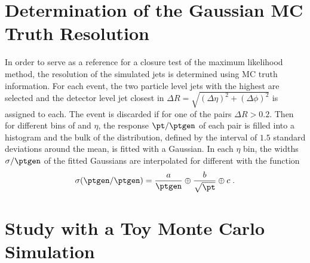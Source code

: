 \appendix


\section{Determination of the Gaussian MC Truth Resolution}\label{sec:ResFit:App:MCTruth}

In order to serve as a reference for a closure test of the maximum
likelihood method, the resolution of the simulated jets is
determined using MC truth information.
For each event, the two particle level jets with the highest \ptgen
are selected and the detector level jet closest in
\mbox{$\Delta R = \sqrt{(\Delta\eta)^{2} + (\Delta\phi)^{2}}$} is assigned to each.
The event is discarded if for one of the pairs $\Delta R > 0.2$.
Then for different bins of \ptgen and $\eta$, the response $\pt/\ptgen$ of each pair is filled into a
histogram and the bulk of the distribution, defined by the interval of $1.5$ standard deviations around the mean, is fitted with a Gaussian.
In each $\eta$ bin, the widths $\sigma/\ptgen$ of the fitted Gaussians are
interpolated for different \ptgen with the function
\begin{equation*}
  \sigma(\ptgen/\ptgen) = \frac{a}{\ptgen} \oplus
  \frac{b}{\sqrt{\pt}} \oplus c \; .
\end{equation*}



\section{Study with a Toy Monte Carlo Simulation}\label{sec:ResFit:App:ToyMC}





